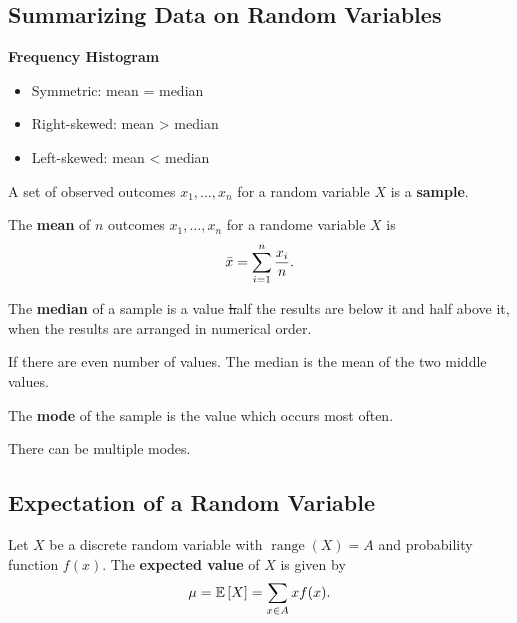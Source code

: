 \subsection{Summarizing Data on Random Variables}

\textbf{Frequency Histogram}
\begin{itemize}
    \item Symmetric: mean = median
    \item Right-skewed: mean > median
    \item Left-skewed: mean < median
\end{itemize}
\begin{definition}
    A set of observed outcomes $x_1, \ldots, x_n$ for a random variable $X$
    is a \textbf{sample}.
\end{definition}

\begin{definition}
    The \textbf{mean} of $n$ outcomes $x_1, \ldots, x_n$ for a randome variable
    $X$ is \[\bar{x} = \displaystyle \sum_{i=1}^n \frac{x_i}{n}.\]
\end{definition}

\begin{definition}
    The \textbf{median} of a sample is a value \st half the results are below it and
    half above it, when the results are arranged in numerical order.
\end{definition}

\begin{note}
    If there are even number of values. The median is the mean of the two middle values.
\end{note}

\begin{definition}
    The \textbf{mode} of the sample is the value which occurs most often. 
\end{definition}

\begin{note}
    There can be multiple modes.
\end{note}


\subsection{Expectation of a Random Variable}

\begin{definition}
    Let $X$ be a discrete random variable with $\operatorname{range}{(X)} = A$ and
    probability function $f(x)$. The \textbf{expected value} of $X$ is given by
    \[\mu = \mathbb{E}\left[{X}\right] = \sum_{x \in A} xf(x).\]   
\end{definition}

